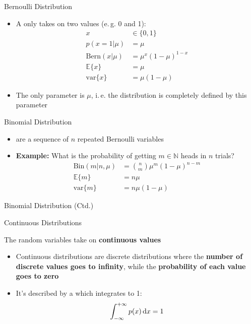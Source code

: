 \begin{frame}{Bernoulli Distribution}{}
	\begin{itemize}
		\item A  only takes on two values (e.\,g. 0 and 1):
		\begin{align}
			x
				&\in \{ 0, 1 \} 				\\
			p(x = 1 \vert \mu)
				&= \mu 					\\
			\text{Bern}(x \vert \mu)
				&= \mu^x (1 - \mu)^{1 - x} 	\\
			\mathbb{E}\{ x \}
				&= \mu 					\\
			\text{var}\{ x \}
				&= \mu (1 - \mu)
		\end{align}
		\item The only parameter is $\mu$, i.\,e. the distribution is completely defined by this parameter
	\end{itemize}
\end{frame}


\begin{frame}{Binomial Distribution}{}
	\begin{itemize}
		\item {} are a sequence of $n$ repeated Bernoulli variables
		\item \textbf{Example:} What is the probability of getting $m \in \mathbb{N}$ heads in $n$ trials?
		\begin{align}
			\text{Bin}(m \vert n, \mu)
				&= \binom{n}{m} \mu^m (1 - \mu)^{n - m}		\\[2mm]
			\mathbb{E}\{ m \}
				&= n \mu 								\\[2mm]
			\text{var}\{ m \}
				&= n \mu (1 - \mu)
		\end{align}
	\end{itemize}
\end{frame}


\begin{frame}{Binomial Distribution (Ctd.)}{}
	
\end{frame}


\begin{frame}{Continuous Distributions}{}
	\begin{boxBlueNoFrame}
		The random variables take on \textbf{continuous values}
	\end{boxBlueNoFrame}

	\begin{itemize}
		\item Continuous distributions are discrete distributions where the \textbf{number of discrete values goes to infinity},
		while the \textbf{probability of each value goes to zero}
		\item It's described by a  which integrates to 1:
		\begin{equation*}
			\int_{-\infty}^{+\infty} p(x) \mathop{}\!\mathrm{d} x = 1
		\end{equation*}
	\end{itemize}
\end{frame}


